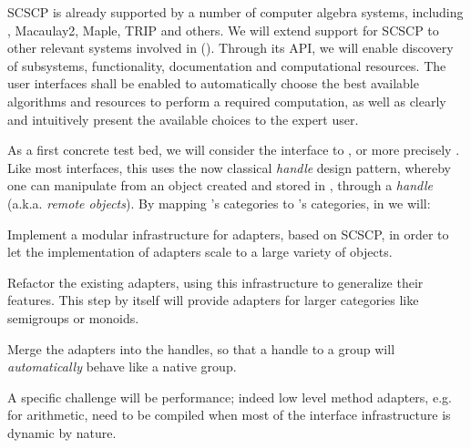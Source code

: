 \begin{workpackage}[id=component-architecture,wphases=0-48!.5,
  title=Component Architecture,lead=UV,
  PSRM=64,UVRM=8,SARM=16, USHRM=4, USORM=6, UBRM=12]
\begin{tasklist}
\begin{task}[title=Interfaces between systems,id=interface-systems,lead=PS,PM=18]
    SCSCP is already supported by a number of computer algebra
    systems, including \GAP, Macaulay2, Maple, TRIP and others. We
    will extend support for SCSCP to other relevant systems involved
    in \TheProject ().
    Through its API, we will enable discovery of subsystems,
    functionality, documentation and computational resources. The user
    interfaces shall be enabled to automatically choose the best
    available algorithms and resources to perform a required
    computation, as well as clearly and intuitively present the
    available choices to the expert user.

    As a first concrete test bed, we will consider the \Sage interface
    to \GAP, or more precisely \libGAP.  Like most \Sage interfaces,
    this uses the now classical \emph{handle} design pattern, whereby
    one can manipulate from \Sage an object created and stored in
    \GAP, through a \emph{handle} (a.k.a. \emph{remote objects}).  By
    mapping \GAP's categories to \Sage's categories, in
     we
    will:
    \begin{compactitem}
    \item Implement a modular infrastructure for adapters, based on
      SCSCP, in order to let the implementation of adapters scale to a
      large variety of objects.
    \item Refactor the existing adapters, using this infrastructure to
      generalize their features. This step by itself will provide
      adapters for larger categories like semigroups or monoids.
    \item Merge the adapters into the handles, so that a handle to a
      \GAP group will \emph{automatically} behave like a native \Sage
      group.
    \end{compactitem}
    A specific challenge will be performance; indeed low level method
    adapters, e.g. for arithmetic, need to be compiled when most of
    the interface infrastructure is dynamic by nature.

  \end{task}


\end{tasklist}
\end{workpackage}
